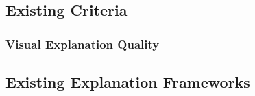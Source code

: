 \documentclass[main]{subfiles}
\begin{document}



\subsection{Existing Criteria}

\subsubsection{Visual Explanation Quality}













\subsection{Existing Explanation Frameworks}







\end{document}
